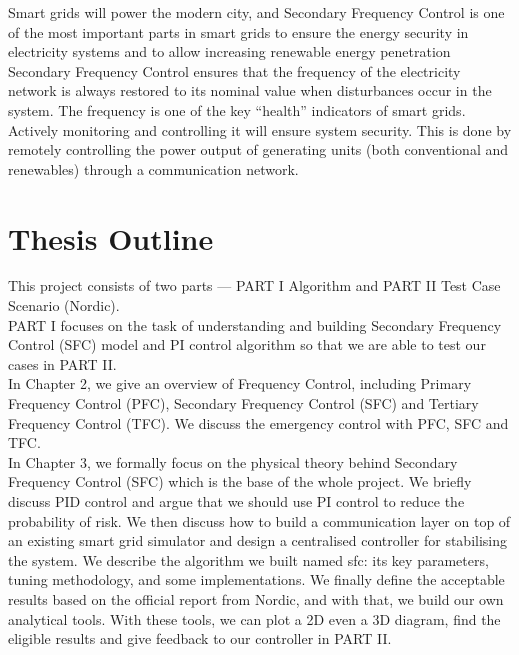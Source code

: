 \documentclass{report}
\begin{document}
Smart grids will power the modern city, and Secondary Frequency Control is one of the most important parts in smart grids to ensure the energy security in electricity systems and to allow increasing renewable energy penetration\\

Secondary Frequency Control ensures that the frequency of the electricity network is always restored to its nominal value when disturbances occur in the system. The frequency is one of the key “health” indicators of smart grids. Actively monitoring and controlling it will ensure system security. This is done by remotely controlling the power output of generating units (both conventional and renewables) through a communication network.\\


\section{Thesis Outline} %
This project consists of two parts — PART I Algorithm and PART II Test Case Scenario (Nordic).\\

PART I focuses on the task of understanding and building Secondary Frequency Control (SFC) model and PI control algorithm so that we are able to test our cases in PART II.\\


In Chapter 2, we give an overview of Frequency Control, including Primary Frequency Control (PFC), Secondary Frequency Control (SFC) and Tertiary Frequency Control (TFC). We discuss the emergency control with PFC, SFC and TFC.\\

In Chapter 3, we formally focus on the physical theory behind Secondary Frequency Control (SFC) which is the base of the whole project. We briefly discuss PID control and argue that we should use PI control to reduce the probability of risk. We then discuss how to build a communication layer on top of an existing smart grid simulator and design a centralised controller for stabilising the system. We describe the algorithm we built named sfc: its key parameters, tuning methodology, and some implementations. We finally define the acceptable results based on the official report from Nordic, and with that, we build our own analytical tools. With these tools, we can plot a 2D even a 3D diagram, find the eligible results and give feedback to our controller in PART II.\\
\end{document}
